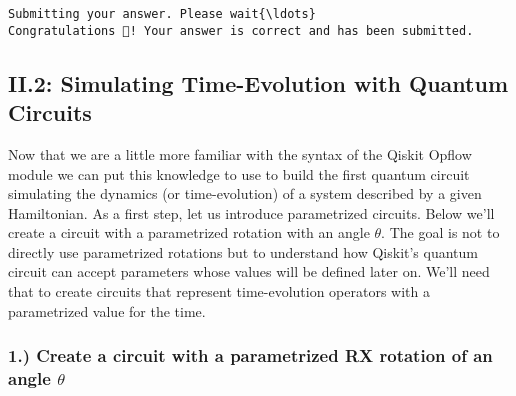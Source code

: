 \documentclass[11pt]{article}
\begin{document}
    \begin{Verbatim}[commandchars=\\\{\}]
Submitting your answer. Please wait{\ldots}
Congratulations 🎉! Your answer is correct and has been submitted.
    \end{Verbatim}

    \hypertarget{ii.2-simulating-time-evolution-with-quantum-circuits}{%
\subsection{II.2: Simulating Time-Evolution with Quantum
Circuits}\label{ii.2-simulating-time-evolution-with-quantum-circuits}}

Now that we are a little more familiar with the syntax of the Qiskit
Opflow module we can put this knowledge to use to build the first
quantum circuit simulating the dynamics (or time-evolution) of a system
described by a given Hamiltonian. As a first step, let us introduce
parametrized circuits. Below we'll create a circuit with a parametrized
rotation with an angle \(\theta\). The goal is not to directly use
parametrized rotations but to understand how Qiskit's quantum circuit
can accept parameters whose values will be defined later on. We'll need
that to create circuits that represent time-evolution operators with a
parametrized value for the time.

\hypertarget{create-a-circuit-with-a-parametrized-rx-rotation-of-an-angle-theta}{%
\subsubsection{\texorpdfstring{1.) Create a circuit with a parametrized
RX rotation of an angle
\(\theta\)}{1.) Create a circuit with a parametrized RX rotation of an angle \textbackslash theta}}\label{create-a-circuit-with-a-parametrized-rx-rotation-of-an-angle-theta}}
\end{document}
